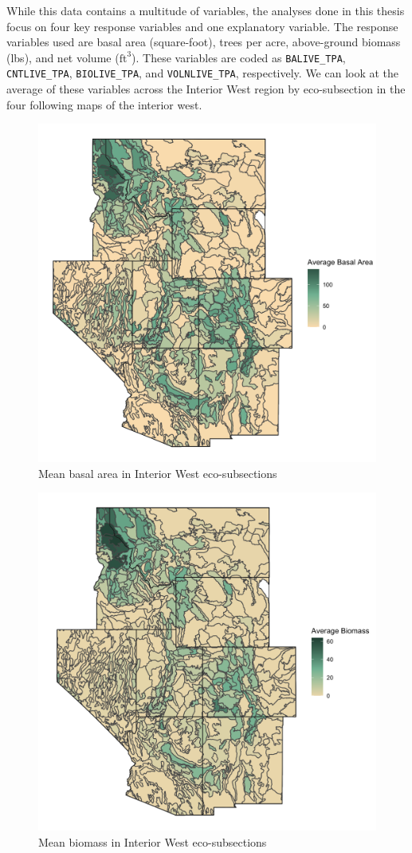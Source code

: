 \documentclass[12pt,twoside]{reedthesis}
\begin{document}
While this data contains a multitude of variables, the analyses done in this thesis focus on four key response variables and one explanatory variable. The response variables used are basal area (square-foot), trees per acre, above-ground biomass (lbs), and net volume (\(\text{ft}^3\)). These variables are coded as \texttt{BALIVE\_TPA}, \texttt{CNTLIVE\_TPA}, \texttt{BIOLIVE\_TPA}, and \texttt{VOLNLIVE\_TPA}, respectively. We can look at the average of these variables across the Interior West region by eco-subsection in the four following maps of the interior west.
\begin{figure}

{\centering \includegraphics[width=0.65\linewidth]{figure/basal} 

}

\caption{Mean basal area in Interior West eco-subsections}\label{fig:unnamed-chunk-5}
\end{figure}
\begin{figure}

{\centering \includegraphics[width=0.65\linewidth]{figure/biomass} 

}

\caption{Mean biomass in Interior West eco-subsections}\label{fig:unnamed-chunk-6}
\end{figure}
\end{document}
